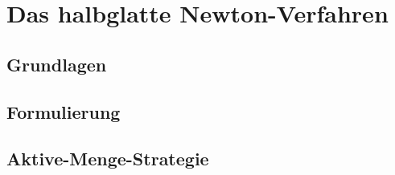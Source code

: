 \chapter{Das halbglatte Newton-Verfahren}
\label{chap:halbglattes_newton_verfahren}

\section{Grundlagen}


\section{Formulierung}


\section{Aktive-Menge-Strategie}

